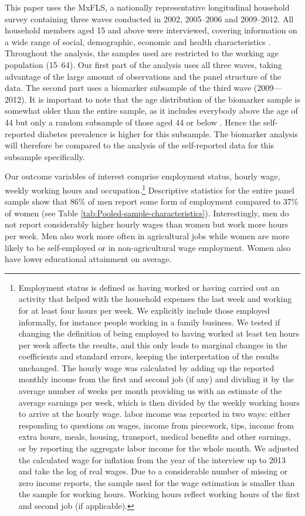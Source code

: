 \documentclass[12pt,english]{article}
\begin{document}
This paper uses the \acf{MxFLS}, a nationally representative longitudinal household survey containing three waves conducted in 2002, 2005--2006 and 2009--2012. All household members aged 15 and above were interviewed, covering information on a wide range of social, demographic, economic and health characteristics \parencite{Rubalcava2013}. Throughout the analysis, the samples used are restricted to the working age population (15--64). Our first part of the analysis uses all three waves, taking advantage of the large amount of observations and the panel structure of the data. The second part uses a biomarker subsample of the third wave (2009---2012). It is important to note that the age distribution of the biomarker sample is somewhat older than the entire sample, as it includes everybody above the age of 44 but only a random subsample of those aged 44 or below \parencite{Crimmins2015}. Hence the self-reported diabetes prevalence is higher for this subsample. The biomarker analysis will therefore be compared to the analysis of the self-reported data for this subsample specifically.

Our outcome variables of interest comprise employment status, hourly wage, weekly working hours and occupation.\footnote{Employment status is defined as having worked or having carried out an activity that helped with the household expenses the last week and working for at least four hours per week. We explicitly include those employed informally, for instance people working in a family business. We tested if changing the definition of being employed to having worked at least ten hours per week affects the results, and this only leads to marginal changes in the coefficients and standard errors, keeping the interpretation of the results unchanged. The hourly wage was calculated by adding up the reported monthly income from the first and second job (if any) and dividing it by the average number of weeks per month providing us with an estimate of the average earnings per week, which is then divided by the weekly working hours to arrive at the hourly wage.  labor income was reported in two ways: either responding to questions on wages, income from piecework, tips, income from extra hours, meals, housing, transport, medical benefits and other earnings, or by reporting the aggregate labor income for the whole month. We adjusted the calculated wage for inflation from the year of the interview up to 2013 and take the log of real wages.  Due to a considerable number of missing or zero income reports, the sample used for the wage estimation is smaller than the sample for working hours. Working hours reflect working hours of the first and second job (if applicable).}    Descriptive statistics for the entire panel sample show that 86\% of men report some form of employment compared to 37\% of women (see Table \ref{tab:Pooled-sample-characteristics}). Interestingly, men do not report considerably higher hourly wages than women but work more hours per week. Men also work more often in agricultural jobs while women are more likely to be self-employed or in non-agricultural wage employment. Women also have lower educational attainment on average.
\end{document}
